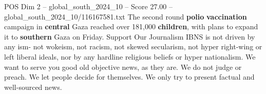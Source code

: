 \begin{textsample}{POS Dim 2 – global\_south\_2024\_10 – Score 27.00 – global\_south\_2024\_10/116167581.txt}
The second round \textbf{polio} \textbf{vaccination} campaign in \textbf{central} Gaza reached over 181,000 \textbf{children}, with plans to expand it to \textbf{southern} Gaza on Friday.
Support Our Journalism IBNS is not driven by any ism- not wokeism, not racism, not skewed secularism, not hyper right-wing or left liberal ideals, nor by any hardline religious beliefs or hyper nationalism.
We want to serve you good old objective news, as they are.
We do not judge or preach.
We let people decide for themselves.
We only try to present factual and well-sourced news.

\end{textsample}
